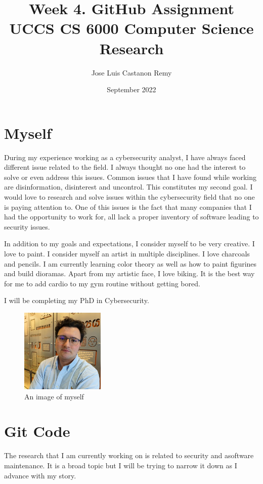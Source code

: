 \documentclass[article]{IEEEtran}
\title{Week 4. GitHub Assignment \\
\large UCCS CS 6000 Computer Science Research}
\author{Jose Luis Castanon Remy}
\date{September 2022}
\begin{document}
\maketitle









\section{Myself}

During my experience working as a cybersecurity analyst, I have always faced different issue related to the field. I always thought no one had the interest to solve or even address this issues. Common issues that I have found while working are disinformation, disinterest and uncontrol. This constitutes my second goal. I would love to research and solve issues within the cybersecurity field that no one is paying attention to. One of this issues is the fact that many companies that I had the opportunity to work for, all lack a proper inventory of software leading to security issues.



In addition to my goals and expectations, I consider myself to be very creative. I love to paint. I consider myself an artist in multiple disciplines. I love charcoals and pencils. I am currently learning color theory as well as how to paint figurines and build dioramas. Apart from my artistic face, I love biking. It is the best way for me to add cardio to my gym routine without getting bored.

I will be completing my PhD in Cybersecurity.


\begin{figure}[htp]
    \centering
    \includegraphics[width=4cm]{UCCSProfileIMG.jpg}
    \caption{An image of myself}
    \label{fig:myself}
\end{figure}


\section{Git Code}
The research that I am currently working on is related to security and asoftware maintenance. It is a broad topic but I will be trying to narrow it down as I advance with my story.
\end{document}
